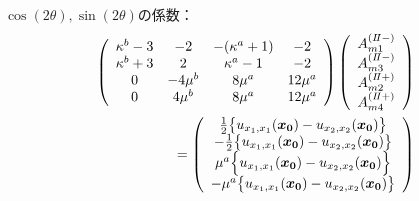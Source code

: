 $\cos(2\theta),\sin(2\theta)$の係数：
\begin{align}
	\left(
	\begin{array}{cccc}
		\kappa^b-3& -2 & -(\kappa^a+1) & -2 \\
		\kappa^b+3 & 2 & \kappa^a-1 & -2 \\
		0 & -4\mu^{b} & 8\mu^{a} & 12\mu^{a} \\
		0 & 4\mu^{b} & 8\mu^{a} & 12\mu^{a} \\
	\end{array}
	\right)
	\left(
	\begin{array}{c}
		A_{m1}^{(I\hspace{-.15em}I-)} \\
	 	A_{m3}^{(I\hspace{-.15em}I-)} \\
		A_{m2}^{(I\hspace{-.15em}I+)}\\
	 	A_{m4}^{(I\hspace{-.15em}I+)} \\
	\end{array}
	\right)
	\nonumber
	\\
	=
	\left(
	\begin{array}{c}
		\frac{1}{2}\bigl\{u_{x_{1},x_{1}}(\bm{x_{0}})-u_{x_{2},x_{2}}(\bm{x_{0}})\bigr\} \\
	 	-\frac{1}{2}\bigl\{u_{x_{1},x_{1}}(\bm{x_{0}})-u_{x_{2},x_{2}}(\bm{x_{0}})\bigr\} \\
		\mu^a\Bigl\{ u_{x_{1},x_{1}}(\bm{x_{0}})- u_{x_{2},x_{2}}(\bm{x_{0}})\Bigr\} \\
	 	-\mu^a \bigl\{u_{x_{1},x_{1}}(\bm{x_{0}})-u_{x_{2},x_{2}}(\bm{x_{0}})\bigr\} \\
	\end{array}
	\right)
\end{align}
